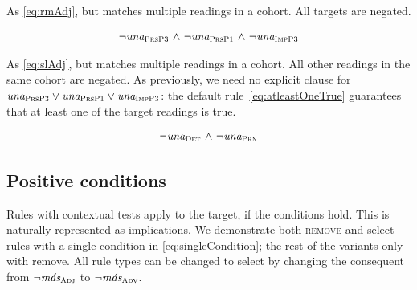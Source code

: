



 As \ref{eq:rmAdj}, but matches multiple readings in a cohort. All targets are negated.

\begin{equation}
\begin{array}{c @{~\wedge~} c @{~\wedge~} c}
\neg{} \unaPrsPThree  & \neg \unaPrsPOne & \neg \unaImp
\end{array}
\label{eq:rmVb}
\end{equation}

 As \ref{eq:slAdj}, but matches multiple readings in a cohort. All other readings in the same cohort are negated.
As previously, we need no explicit clause for $\text{\em una}_{\text{\sc PrsP3}}  \vee \text{\em una}_{\text{\sc PrsP1}} \vee \text{\em una}_{\text{\sc ImpP3}}$: the default rule~\ref{eq:atleastOneTrue} guarantees that at least one of the target readings is true.

\begin{equation}
\begin{array}{c @{~\wedge~} c}
\neg \unaDet & \neg \unaPrn \\
\end{array}
\label{eq:slVb}
\end{equation}


\subsection{Positive conditions} 

Rules with contextual tests apply to the target, if the conditions hold. 
This is naturally represented as implications. We demonstrate both \textsc{remove} and {\sc select} rules with a single condition in \ref{eq:singleCondition}; the rest of the variants only with {\sc remove}. All rule types can be changed to {\sc select} by changing the consequent from $\neg{}\text{\em m\'{a}s}_{\text{\sc Adj}}$ to $\neg{}\text{\em m\'{a}s}_{\text{\sc Adv}}$. %


